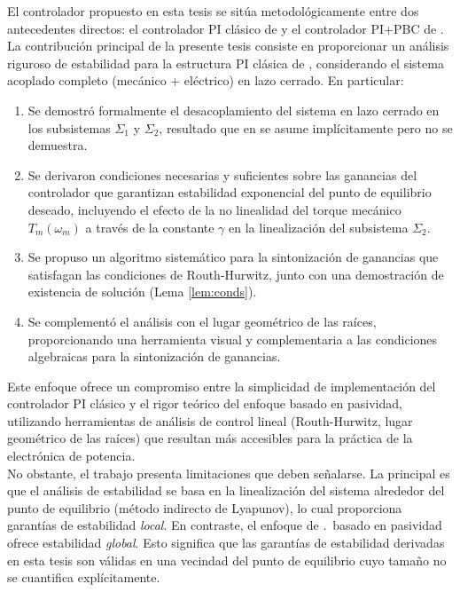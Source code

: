 El controlador propuesto en esta tesis se sitúa metodológicamente entre dos 
antecedentes directos: el controlador PI clásico de \cite{chinchilla2006} y 
el controlador PI+PBC de \cite{cisneros2020}.
\\

La contribución principal de la presente tesis consiste en proporcionar un 
análisis riguroso de estabilidad para la estructura PI clásica de \cite{chinchilla2006}, 
considerando el sistema acoplado completo (mecánico + eléctrico) en 
lazo cerrado. En particular:

\begin{enumerate}
    \item Se demostró formalmente el desacoplamiento del sistema en lazo cerrado 
    en los subsistemas $\Sigma_1$ y $\Sigma_2$, resultado que 
    en \cite{chinchilla2006} se asume implícitamente pero no se demuestra.

    \item Se derivaron condiciones necesarias y suficientes sobre las ganancias 
    del controlador que garantizan estabilidad exponencial del punto de 
    equilibrio deseado, incluyendo el efecto de la no linealidad del torque 
    mecánico $T_m(\omega_m)$ a través de la constante $\gamma$ en la 
    linealización del subsistema $\Sigma_2$.

    \item Se propuso un algoritmo sistemático para la sintonización de ganancias 
    que satisfagan las condiciones de Routh-Hurwitz, junto con una demostración 
    de existencia de solución (Lema \ref{lem:conds}).

    \item Se complementó el análisis con el lugar geométrico de las raíces, 
    proporcionando una herramienta visual y complementaria a las condiciones 
    algebraicas para la sintonización de ganancias.
\end{enumerate}

Este enfoque ofrece un compromiso entre la simplicidad de implementación del 
controlador PI clásico y el rigor teórico del enfoque basado en pasividad, 
utilizando herramientas de análisis de control lineal (Routh-Hurwitz, lugar 
geométrico de las raíces) que resultan más accesibles para la práctica de la 
electrónica de potencia.
\\

No obstante, el trabajo presenta limitaciones que deben señalarse. La principal 
es que el análisis de estabilidad se basa en la linealización del sistema 
alrededor del punto de equilibrio (método indirecto de Lyapunov), lo cual 
proporciona garantías de estabilidad \textit{local}. En contraste, el enfoque 
de \cite{cisneros2020}.\ basado en pasividad ofrece estabilidad \textit{global}. 
Esto significa que las garantías de estabilidad derivadas en esta tesis son 
válidas en una vecindad del punto de equilibrio cuyo tamaño no se cuantifica 
explícitamente.
\\

